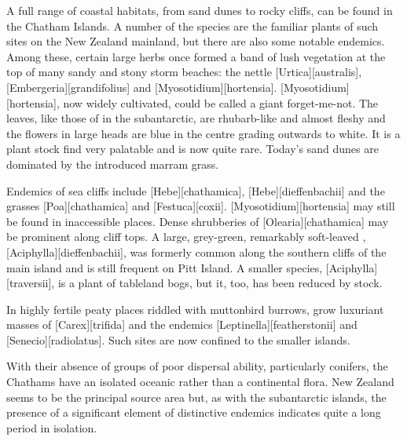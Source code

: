 A full range of coastal habitats, from sand dunes to rocky cliffs, can be found in the Chatham Islands.
A number of the species are the familiar plants of such sites on the New Zealand mainland, but there are also some notable endemics.
Among these, certain large herbs once formed a band of lush vegetation at the top of many sandy and stony storm beaches: the nettle [Urtica][australis], [Embergeria][grandifolius] and [Myosotidium][hortensia]. [Myosotidium][hortensia], now widely cultivated, could be called a giant forget-me-not.
The leaves, like those of  in the subantarctic, are rhubarb-like and almost fleshy and the flowers in large heads are blue in the centre grading outwards to white.
It is a plant stock find very palatable and is now quite rare.
Today's sand dunes are dominated by the introduced marram grass.

Endemics of sea cliffs include [Hebe][chathamica], [Hebe][dieffenbachii] and the grasses [Poa][chathamica] and [Festuca][coxii]. [Myosotidium][hortensia] may still be found in inaccessible places.
Dense shrubberies of [Olearia][chathamica] may be prominent along cliff tops.
A large, grey-green, remarkably soft-leaved , [Aciphylla][dieffenbachii], was formerly common along the southern cliffs of the main island and is still frequent on Pitt Island.
A smaller species, [Aciphylla][traversii], is a plant of tableland bogs, but it, too, has been reduced by stock.

In highly fertile peaty places riddled with muttonbird burrows, grow luxuriant masses of [Carex][trifida] and the endemics [Leptinella][featherstonii] and [Senecio][radiolatus].
Such sites are now confined to the smaller islands.

With their absence of groups of poor dispersal ability, particularly conifers, the Chathams have an isolated oceanic rather than a continental flora.
New Zealand seems to be the principal source area but, as with the subantarctic islands, the presence of a significant element of distinctive endemics indicates quite a long period in isolation.


